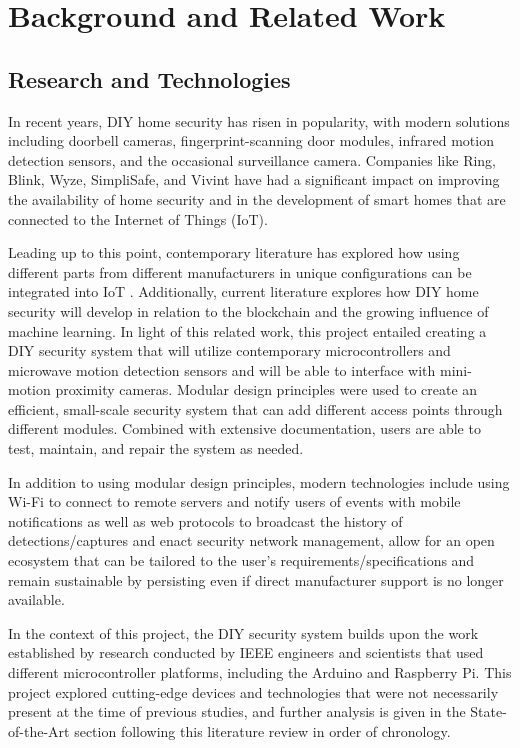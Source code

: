 \section{Background and Related Work}\label{sec:background-and-related-work}

\subsection{Research and Technologies}\label{subsec:research-and-technologies}

In recent years, DIY home security has risen in popularity, with modern solutions including
doorbell cameras, fingerprint-scanning door modules, infrared motion detection sensors, and
the occasional surveillance camera. Companies like Ring, Blink, Wyze, SimpliSafe, and Vivint
have had a significant impact on improving the availability of home security and in the
development of smart homes that are connected to the Internet of Things (IoT).

Leading up to this point, contemporary literature has explored how using different parts
from different manufacturers in unique configurations can be integrated into
IoT \cite{sarhan2020}. Additionally, current literature explores how DIY home security will
develop in relation to the blockchain \cite{arifEtAl_2020} and the growing influence
of machine learning\cite{khanEtAl2021}. In light of this related work, this project entailed
creating a DIY security system that will utilize contemporary microcontrollers and microwave
motion detection sensors and will be able to interface with mini-motion proximity cameras.
Modular design principles were used to create an efficient, small-scale security system that
can add different access points through different modules. Combined with extensive
documentation, users are able to test, maintain, and repair the system as needed.

In addition to using modular design principles, modern technologies include using Wi-Fi
to connect to remote servers and notify users of events with mobile notifications as well
as web protocols to broadcast the history of detections/captures and enact security
network management, allow for an open ecosystem that can be tailored to the user’s
requirements/specifications and remain sustainable by persisting even if direct
manufacturer support is no longer available.

In the context of this project, the DIY security system builds upon the work established
by research conducted by IEEE engineers and scientists that used different microcontroller
platforms, including the Arduino and Raspberry Pi. This project explored cutting-edge devices
and technologies that were not necessarily present at the time of previous studies, and
further analysis is given in the State-of-the-Art section following this literature review in order of chronology.

